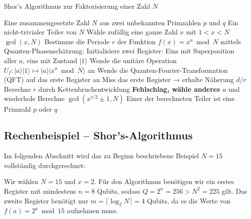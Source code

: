 \begin{algorithm}[H] %
\caption{Shor's Algorithmus zur Faktorisierung einer Zahl \( N \)}
\label{algorithm:shor}
\begin{algorithmic}[1]
\Require Eine zusammengesetzte Zahl \( N \) aus zwei unbekannten Primzahlen \( p \) und \( q \)
\Ensure Ein nicht-trivialer Teiler von \( N \)
\State Wähle zufällig eine ganze Zahl \( x \) mit \( 1 < x < N \)
    \State \Return \( \gcd(x, N) \) 
\EndIf
\State Bestimme die Periode \( r \) der Funktion \( f(x) = x^a \bmod N \) mittels Quanten-Phasenschätzung:
\State Initialisiere zwei Register: Eins mit Superposition aller \( a \), eins mit Zustand \( |1\rangle \)
\State Wende die unitäre Operation \( U_f \colon |a\rangle|1\rangle \mapsto |a\rangle|x^a \bmod N\rangle \) an
\State Wende die Quanten-Fourier-Transformation (QFT) auf das erste Register an
\State Miss das erste Register → erhalte Näherung \( d/r \)
\State Berechne \( r \) durch Kettenbruchentwicklung
    \State \Return \textbf{Fehlschlag, wähle anderes \( a \)} und wiederhole
\EndIf
\State Berechne \( \gcd(x^{r/2} \pm 1, N) \)
\State \Return Einer der berechneten Teiler ist eine Primzahl \( p \) oder \( q \)
\end{algorithmic}
\end{algorithm}

\subsection{Rechenbeispiel – Shor's-Algorithmus}

Im folgenden Abschnitt wird das zu Beginn beschriebene Beispiel \( N = 15 \) vollständig durchgerechnet:

Wir wählen \( N = 15 \) und \( x = 2 \). Für den Algorithmus benötigen wir ein erstes Register mit mindestens \( n = 8 \) Qubits, sodass \( Q = 2^n = 256 > N^2 = 225 \) gilt. Das zweite Register benötigt nur \( m = \lceil \log_2 N \rceil = 4 \) Qubits, da es die Werte von \( f(a) = 2^a \bmod 15 \) aufnehmen muss.

